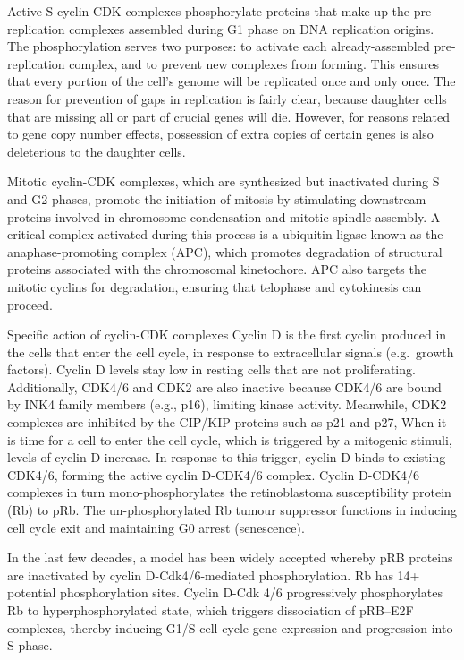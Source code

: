 Active S cyclin-CDK complexes phosphorylate proteins that make up the pre-replication complexes assembled during G1 phase on DNA replication origins. The phosphorylation serves two purposes: to activate each already-assembled pre-replication complex, and to prevent new complexes from forming. This ensures that every portion of the cell's genome will be replicated once and only once. The reason for prevention of gaps in replication is fairly clear, because daughter cells that are missing all or part of crucial genes will die. However, for reasons related to gene copy number effects, possession of extra copies of certain genes is also deleterious to the daughter cells.

Mitotic cyclin-CDK complexes, which are synthesized but inactivated during S and G2 phases, promote the initiation of mitosis by stimulating downstream proteins involved in chromosome condensation and mitotic spindle assembly. A critical complex activated during this process is a ubiquitin ligase known as the anaphase-promoting complex (APC), which promotes degradation of structural proteins associated with the chromosomal kinetochore. APC also targets the mitotic cyclins for degradation, ensuring that telophase and cytokinesis can proceed.

Specific action of cyclin-CDK complexes
Cyclin D is the first cyclin produced in the cells that enter the cell cycle, in response to extracellular signals (e.g.~growth factors). Cyclin D levels stay low in resting cells that are not proliferating. Additionally, CDK4/6 and CDK2 are also inactive because CDK4/6 are bound by INK4 family members (e.g., p16), limiting kinase activity. Meanwhile, CDK2 complexes are inhibited by the CIP/KIP proteins such as p21 and p27, When it is time for a cell to enter the cell cycle, which is triggered by a mitogenic stimuli, levels of cyclin D increase. In response to this trigger, cyclin D binds to existing CDK4/6, forming the active cyclin D-CDK4/6 complex. Cyclin D-CDK4/6 complexes in turn mono-phosphorylates the retinoblastoma susceptibility protein (Rb) to pRb. The un-phosphorylated Rb tumour suppressor functions in inducing cell cycle exit and maintaining G0 arrest (senescence).

In the last few decades, a model has been widely accepted whereby pRB proteins are inactivated by cyclin D-Cdk4/6-mediated phosphorylation. Rb has 14+ potential phosphorylation sites. Cyclin D-Cdk 4/6 progressively phosphorylates Rb to hyperphosphorylated state, which triggers dissociation of pRB--E2F complexes, thereby inducing G1/S cell cycle gene expression and progression into S phase.

